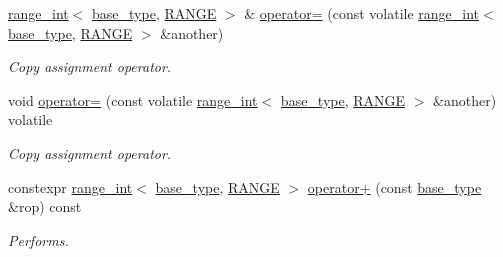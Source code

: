 \begin{DoxyCompactItemize}
\mbox{\label{classfsl_1_1lg_1_1range__int_ad82d4dce8e2d3bdd23b233bf12b25482}} 
\mbox{\hyperlink{classfsl_1_1lg_1_1range__int}{range\+\_\+int}}$<$ \mbox{\hyperlink{classfsl_1_1lg_1_1range__int_a4ce67cd216fd303b7bae83a7cbcab3bb}{base\+\_\+type}}, \mbox{\hyperlink{classfsl_1_1lg_1_1range__int_a438be32af68025525703578ac9fdcd09}{R\+A\+N\+GE}} $>$ \& \mbox{\hyperlink{classfsl_1_1lg_1_1range__int_ad82d4dce8e2d3bdd23b233bf12b25482}{operator=}} (const volatile \mbox{\hyperlink{classfsl_1_1lg_1_1range__int}{range\+\_\+int}}$<$ \mbox{\hyperlink{classfsl_1_1lg_1_1range__int_a4ce67cd216fd303b7bae83a7cbcab3bb}{base\+\_\+type}}, \mbox{\hyperlink{classfsl_1_1lg_1_1range__int_a438be32af68025525703578ac9fdcd09}{R\+A\+N\+GE}} $>$ \&another)
\begin{DoxyCompactList}\small\item\em Copy assignment operator. \end{DoxyCompactList}\item 
\mbox{\label{classfsl_1_1lg_1_1range__int_a59360281bf7435691733eefa6a3772fd}} 
void \mbox{\hyperlink{classfsl_1_1lg_1_1range__int_a59360281bf7435691733eefa6a3772fd}{operator=}} (const volatile \mbox{\hyperlink{classfsl_1_1lg_1_1range__int}{range\+\_\+int}}$<$ \mbox{\hyperlink{classfsl_1_1lg_1_1range__int_a4ce67cd216fd303b7bae83a7cbcab3bb}{base\+\_\+type}}, \mbox{\hyperlink{classfsl_1_1lg_1_1range__int_a438be32af68025525703578ac9fdcd09}{R\+A\+N\+GE}} $>$ \&another) volatile
\begin{DoxyCompactList}\small\item\em Copy assignment operator. \end{DoxyCompactList}\item 
\mbox{\label{classfsl_1_1lg_1_1range__int_a61dfb1dc667dbb7afefa10680749c8e4}} 
constexpr \mbox{\hyperlink{classfsl_1_1lg_1_1range__int}{range\+\_\+int}}$<$ \mbox{\hyperlink{classfsl_1_1lg_1_1range__int_a4ce67cd216fd303b7bae83a7cbcab3bb}{base\+\_\+type}}, \mbox{\hyperlink{classfsl_1_1lg_1_1range__int_a438be32af68025525703578ac9fdcd09}{R\+A\+N\+GE}} $>$ \mbox{\hyperlink{classfsl_1_1lg_1_1range__int_a61dfb1dc667dbb7afefa10680749c8e4}{operator+}} (const \mbox{\hyperlink{classfsl_1_1lg_1_1range__int_a4ce67cd216fd303b7bae83a7cbcab3bb}{base\+\_\+type}} \&rop) const
\begin{DoxyCompactList}\small\item\em Performs. \end{DoxyCompactList}\item 

\end{DoxyCompactItemize}

